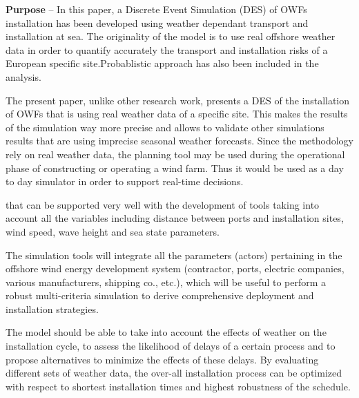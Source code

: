 \textbf{Purpose} --
In this paper, a Discrete Event Simulation (DES) of OWFs installation has been developed using weather dependant transport and installation at sea. The originality of the model is to use real offshore weather data in order to quantify accurately the transport and installation risks of a European specific site.Probablistic approach has also been included in the analysis.


The present paper, unlike other research work, presents a DES of the installation of OWFs that is using real weather data of a specific site. This makes the results of the simulation way more precise and allows to validate other simulations results that are using imprecise seasonal weather forecasts. Since the methodology rely on real weather data, the planning tool may be used during the operational phase of constructing or operating a wind farm. Thus it would be used as a day to day simulator in order to support real-time decisions.

that can be supported very well with the development of tools taking into account all the variables including distance between ports and installation sites, wind speed, wave height and sea state parameters.

The simulation tools will integrate all the parameters (actors) pertaining in the offshore wind energy development system (contractor, ports, electric companies, various manufacturers, shipping co., etc.), which will be useful to perform a robust multi-criteria simulation to derive comprehensive deployment and installation strategies.

The model should be able to take into account the effects of weather on the installation cycle, to assess the likelihood of delays of a certain process and to propose alternatives to minimize the effects of these delays. By evaluating different sets of weather data, the over-all installation process can be optimized with respect to shortest installation times and highest robustness of the schedule.